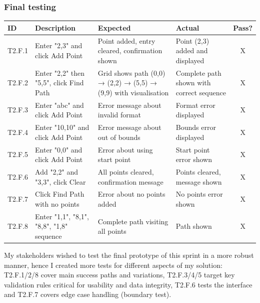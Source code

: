 \subsubsection{Final testing}

\begin{table}[!htbp]
	\centering
	\begin{tabularx}{\textwidth}{|l|X|p{3.5cm}|p{3.5cm}|c|}
		\hline
		\textbf{ID} & \textbf{Description} & \textbf{Expected} & \textbf{Actual} & \textbf{Pass?} \\
		\hline
		T2.F.1 & Enter "2,3" and click Add Point & Point added, entry cleared, confirmation shown & Point (2,3) added and displayed & X \\
		\hline
		T2.F.2 & Enter "2,2" then "5,5", click Find Path & Grid shows path (0,0) → (2,2) → (5,5) → (9,9) with visualisation & Complete path shown with correct sequence & X \\
		\hline
		T2.F.3 & Enter "abc" and click Add Point & Error message about invalid format & Format error displayed & X \\
		\hline
		T2.F.4 & Enter "10,10" and click Add Point & Error message about out of bounds & Bounds error displayed & X \\
		\hline
		T2.F.5 & Enter "0,0" and click Add Point & Error about using start point & Start point error shown & X \\
		\hline
		T2.F.6 & Add "2,2" and "3,3", click Clear & All points cleared, confirmation message & Points cleared, message shown & X \\
		\hline
		T2.F.7 & Click Find Path with no points & Error about no points added & No points error shown & X \\
		\hline
		T2.F.8 & Enter "1,1", "8,1", "8,8", "1,8" sequence & Complete path visiting all points & Path shown & X \\
		\hline
	\end{tabularx}
\end{table}

My stakeholders wished to test the final prototype of this sprint in a more robust manner, hence I created more tests for different aspects of my solution: T2.F.1/2/8 cover main success paths and variations, T2.F.3/4/5 target key validation rules critical for usability and data integrity, T2.F.6 tests the interface and T2.F.7 covers edge case handling (boundary test).

\newpage


